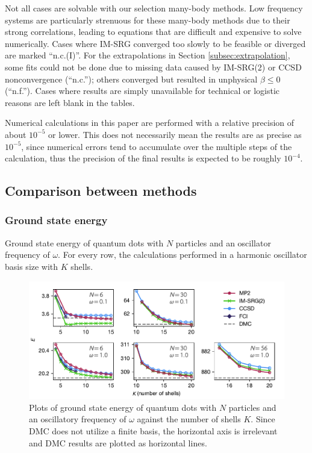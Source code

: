 Not all cases are solvable with our selection many-body methods.  Low frequency systems are particularly strenuous for these many-body methods due to their strong correlations, leading to equations that are difficult and expensive to solve numerically.  Cases where IM-SRG converged too slowly to be feasible or diverged are marked ``n.c.(I)''.  For the extrapolations in Section \ref{subsec:extrapolation}, some fits could not be done due to missing data caused by IM-SRG(2) or CCSD nonconvergence (``n.c.''); others converged but resulted in unphysical $\beta \le 0$ (``n.f.'').  Cases where results are simply unavailable for technical or logistic reasons are left blank in the tables.

Numerical calculations in this paper are performed with a relative precision of about $10^{-5}$ or lower.  This does not necessarily mean the results are as precise as $10^{-5}$, since numerical errors tend to accumulate over the multiple steps of the calculation, thus the precision of the final results is expected to be roughly $10^{-4}$.

\subsection{Comparison between methods}

\subsubsection{Ground state energy}

\begin{table}
  \centering
  \caption{Ground state energy of quantum dots with $N$ particles and an oscillator frequency of $\omega$.  For every row, the calculations performed in a harmonic oscillator basis size with $K$ shells.}
  \label{tab:ground}
  
\end{table}

\begin{figure}
  \centering
  \includegraphics{fig-gs2}
  \caption{Plots of ground state energy of quantum dots with $N$ particles and an oscillatory frequency of $\omega$ against the number of shells $K$.  Since DMC does not utilize a finite basis, the horizontal axis is irrelevant and DMC results are plotted as horizontal lines.}
  \label{fig:gs}
\end{figure}

